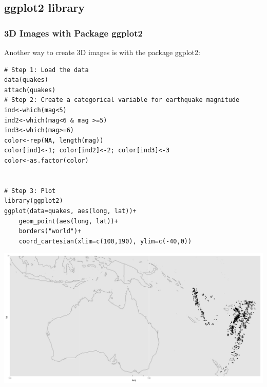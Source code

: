 \subsection{\ttfamily ggplot2 \normalfont library} 
\begin{frame}
\frametitle{3D Images with Package \ttfamily ggplot2 \normalfont}

Another way to create 3D images is with the package \ttfamily ggplot2: \normalfont 

\begin{lstlisting}
# Step 1: Load the data
data(quakes)
attach(quakes)
# Step 2: Create a categorical variable for earthquake magnitude
ind<-which(mag<5)
ind2<-which(mag<6 & mag >=5)
ind3<-which(mag>=6)
color<-rep(NA, length(mag))
color[ind]<-1; color[ind2]<-2; color[ind3]<-3
color<-as.factor(color)


# Step 3: Plot
library(ggplot2)
ggplot(data=quakes, aes(long, lat))+
	geom_point(aes(long, lat))+
	borders("world")+
	coord_cartesian(xlim=c(100,190), ylim=c(-40,0))
\end{lstlisting}

\newpage
       \begin{center}
		\includegraphics[scale=0.22]{images/ggplotPlot1.pdf}
	\end{center}
\end{frame}

